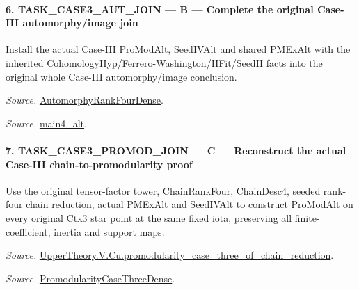 \documentclass[11pt,a4paper]{article}
\numberwithin{equation}{section}
\theoremstyle{remark}\newtheorem{remark}[theorem]{Remark}
\begin{document}
\paragraph{6. TASK\_\allowbreak CASE3\_\allowbreak AUT\_\allowbreak JOIN — B — Complete the original Case-III automorphy/image join}

Install the actual Case-III ProModAlt, SeedIVAlt and shared PMExAlt with the inherited CohomologyHyp/Ferrero-Washington/HFit/SeedII facts into the original whole Case-III automorphy/image conclusion.

\emph{Source.} \href{https://github.com/CocoSgt/riemann-hypothesis-lean/blob/7cbf7a0c32fca1badf05931879a37c3f8a2b03b4/src/Development/AutomorphicArithmetic/AutomorphicVarieties/ModularityArgument/ThresholdArguments/DenseThresholdCases/PromodularityCaseThree.lean#L43-L44}{AutomorphyRankFourDense}.

\emph{Source.} \href{https://github.com/CocoSgt/riemann-hypothesis-lean/blob/7cbf7a0c32fca1badf05931879a37c3f8a2b03b4/src/Development/AutomorphicArithmetic/AutomorphicVarieties/ModularityArgument/ThresholdArguments/DenseThresholdCases/CuFinal.lean#L44-L44}{main4\_\allowbreak alt}.



\paragraph{7. TASK\_\allowbreak CASE3\_\allowbreak PROMOD\_\allowbreak JOIN — C — Reconstruct the actual Case-III chain-to-promodularity proof}

Use the original tensor-factor tower, ChainRankFour, ChainDesc4, seeded rank-four chain reduction, actual PMExAlt and SeedIVAlt to construct ProModAlt on every original Ctx3 star point at the same fixed iota, preserving all finite-coefficient, inertia and support maps.

\emph{Source.} \href{https://github.com/CocoSgt/riemann-hypothesis-lean/blob/7cbf7a0c32fca1badf05931879a37c3f8a2b03b4/src/Development/AutomorphicArithmetic/AutomorphicVarieties/ModularityArgument/ThresholdArguments/DenseThresholdCases/PromodularityCaseThreeOfLemmas.lean#L131-L153}{UpperTheory.V.Cu.promodularity\_\allowbreak case\_\allowbreak three\_\allowbreak of\_\allowbreak chain\_\allowbreak reduction}.

\emph{Source.} \href{https://github.com/CocoSgt/riemann-hypothesis-lean/blob/7cbf7a0c32fca1badf05931879a37c3f8a2b03b4/src/Development/AutomorphicArithmetic/AutomorphicVarieties/ModularityArgument/ThresholdArguments/DenseThresholdCases/PromodularityCaseThree.lean#L40-L42}{PromodularityCaseThreeDense}.
\end{document}
